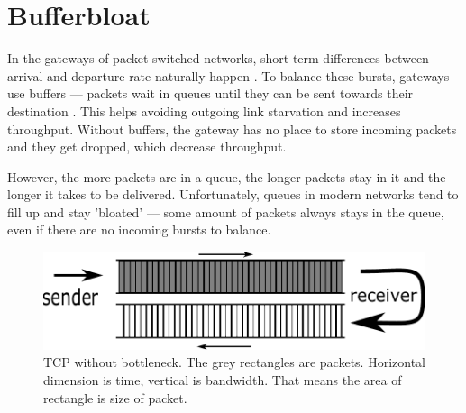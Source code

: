 \section{Bufferbloat}
\label{chap:bb}

In the gateways  of packet-switched networks, short-term differences between arrival and departure rate  naturally happen . To balance these bursts, gateways use buffers --- packets   wait in queues until they can be sent towards their destination . This  helps avoiding outgoing  link starvation and increases throughput. Without buffers, the gateway has no place to store incoming packets and they get dropped, which decrease throughput. 


However, the more packets are in a queue, the longer packets stay in it and the longer it takes  to be delivered. Unfortunately, queues in modern networks tend to fill up and stay 'bloated' \cite{Gettys:2012:BDB:2063176.2063196} --- some amount of packets always stays in the queue, even if there are no incoming bursts to balance. 

\begin{figure}
	\centering
	\includegraphics[width=137mm]{drawings/tcp_no_bottleneck}
	\caption{TCP without bottleneck. The grey rectangles are packets. Horizontal dimension is time, vertical is bandwidth. That means the area of rectangle is size of packet.}
	\label{fig01:no_bottle}
\end{figure}

